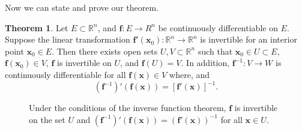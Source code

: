\documentclass{article}
\newcommand{\R}{\mathbb{R}}
\newcommand{\x}{\mathbf{x}}
\newcommand{\f}{\mathbf{f}}
\theoremstyle{definition}
\newtheorem{theorem}{Theorem}[section]
\begin{document}
	Now we can state and prove our theorem.
	\begin{theorem}
		Let $ E\subset \R^n $, and $ \f:E\to R^n $ be continuously differentiable on $ E $. Suppose the linear transformation $ \f'(\x_0):\R^n\to\R^n$ is invertible for an interior point $ \x_0\in E $.  Then there exists open sets $ U,V\subset \R^n $ such that $ \x_0\in U\subset E $, $ \f(\x_0)\in V $, $ \f $ is invertible on $ U $, and $ \f(U)=V $. In addition,  $ \f^{-1}:V\to W$ is continuously differentiable for all $ \f(\x) \in V $ where, and 
		$$ (\f^{-1})'(\f(\x)) = [\f'(\x)]^{-1}.$$
	\end{theorem}
	\begin{figure}[h!]
		\centering
		\caption{Under the conditions of the inverse function theorem, $ \f $ is invertible on the set $ U $ and $  (\f^{-1})'(\f(\x)) = (\f'(\x))^{-1} $ for all $ \x\in U $.}
	\end{figure}	
\end{document}
